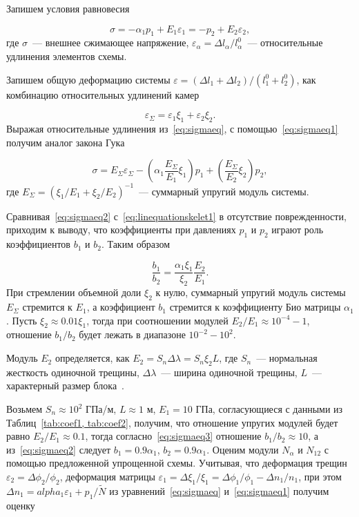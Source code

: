 Запишем условия равновесия

\begin{equation}
  \label{eq:sigmaeq}
  \sigma = - \alpha_1 p_1 + E_1 \varepsilon_1 = - p_2 + E_2 \varepsilon_2,
\end{equation}
где $\sigma$~--- внешнее сжимающее напряжение, $\varepsilon_{\alpha} = \Delta l_{\alpha} / l_{\alpha}^0$~--- относительные удлинения элементов схемы.

Запишем общую деформацию системы $\varepsilon =  (\Delta l_1 + \Delta l_2) / (l_1^0 + l_2^0)$, как комбинацию относительных удлинений камер

\begin{equation}
  \label{eq:sigmaeq1}
  \varepsilon_{\Sigma} = \varepsilon_1 \xi_1 + \varepsilon_2 \xi_2.
\end{equation}
Выражая относительные удлинения из~\eqref{eq:sigmaeq}, с помощью~\eqref{eq:sigmaeq1} получим аналог закона Гука

\begin{equation}
  \label{eq:sigmaeq2}
  \sigma = E_{\Sigma} \varepsilon_{\Sigma} - \left( \alpha_1 \frac{E_{\Sigma}}{E_1} \xi_1 \right) p_1 + \left( \frac{E_{\Sigma}}{E_2} \xi_2 \right) p_2,
\end{equation}
где $E_{\Sigma} = (\xi_1 / E_1 + \xi_2 / E_2)^{-1}$~--- суммарный упругий модуль системы.

Сравнивая~\eqref{eq:sigmaeq2} с~\eqref{eq:linequationskelet1} в отсутствие поврежденности, приходим к выводу, что коэффициенты при давлениях $p_1$ и $p_2$ играют роль коэффициентов $b_1$ и $b_2$. Таким образом

\begin{equation}
  \label{eq:sigmaeq3}
  \frac{b_1}{b_2} = \frac{\alpha_1 \xi_1}{\xi_2} \frac{E_2}{E_1}.
\end{equation}
При стремлении объемной доли $\xi_2$ к нулю, суммарный упругий модуль системы $E_{\Sigma}$ стремится к $E_1$, а коэффициент $b_1$ стремится к коэффициенту Био матрицы $\alpha_1$. Пусть $\xi_2 \approx 0.01 \xi_1$, тогда при соотношении модулей $E_2/E_1 \approx 10^{-4} - 1$, отношение $b_1/b_2$ будет лежать в диапазоне $10^{-2} - 10^2$.

Модуль $E_2$ определяется, как $E_2 = S_n \Delta \lambda = S_n \xi_2 L$, где $S_n$~--- нормальная жесткость одиночной трещины, $\Delta \lambda$~--- ширина одиночной трещины, $L$~--- характерный размер блока~\autocite{kocharyan2016}.

Возьмем $S_n \approx 10^2$ ГПа/м, $L \approx 1$ м, $E_1 = 10$ ГПа, согласующиеся с данными из Таблиц~\ref{tab:coef1, tab:coef2}, получим, что отношение упругих модулей будет равно $E_2/E_1 \approx 0.1$, тогда согласно~\eqref{eq:sigmaeq3} отношение $b_1/b_2 \approx 10$, а из~\eqref{eq:sigmaeq2} следует $b_1 = 0.9 \alpha_1$, $b_2 = 0.9 \alpha_1$.
Оценим модули $N_{\alpha}$ и $N_{12}$ с помощью предложенной упрощенной схемы. Учитывая, что деформация трещин $\varepsilon_2 = \Delta \phi_2/\phi_2$, деформация матрицы $\varepsilon_1 = \Delta \xi_1 / \xi_1 = \Delta \phi_1 / \phi_1 - \Delta n_1 / n_1$, при этом $\Delta n_1 = alpha_1 \varepsilon_1 + p_1 / \widetilde{N}$ из уравнений~\eqref{eq:sigmaeq} и~\eqref{eq:sigmaeq1} получим оценку

